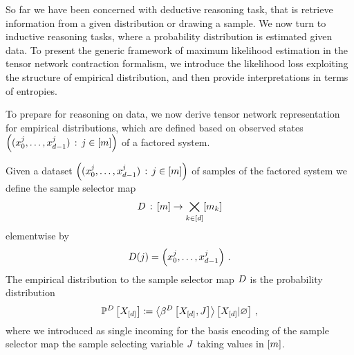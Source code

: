 So far we have been concerned with deductive reasoning task, that is retrieve information from a given distribution or drawing a sample.
We now turn to inductive reasoning tasks, where a probability distribution is estimated given data.
To present the generic framework of maximum likelihood estimation in the tensor network contraction formalism, we introduce the likelihood loss exploiting the structure of empirical distribution, and then provide interpretations in terms of entropies.

\label{sec:empDistribution}

To prepare for reasoning on data, we now derive tensor network representation for empirical distributions, which are defined based on observed states $\left(({x_{0}^{j},\ldots,x_{d-1}^{j}})\,:\,j\in[m]\right)$ of a factored system.

\begin{definition}
    \label{def:dataMap}
    Given a dataset $\left(({x_{0}^{j},\ldots,x_{d-1}^{j}})\,:\,j\in[m]\right)$ of samples of the factored system we define the sample selector map
    \begin{align*}
        D \,:\, [m] \rightarrow \bigtimes_{k\in[d]}[m_{k}]
    \end{align*}
    elementwise by
    \begin{align*}
        D(j) = \left({x_{0}^{j},\ldots,x_{d-1}^{j}}\right) \, .
    \end{align*}
    The empirical distribution to the sample selector map $D$ is the probability distribution
    \begin{align*}
        \mathbb{P}^{D}\left[X_{[d]}\right]
        \coloneqq \left\langle \beta^{D}\left[X_{[d]},J\right]\right\rangle \left[ X_{[d]} | \varnothing \right] \, ,
    \end{align*}
    where we introduced as single incoming for the basis encoding of the sample selector map the sample selecting variable $J$ taking values in $[m]$.
\end{definition}

